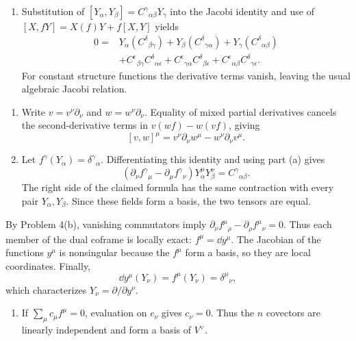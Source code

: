 \begin{enumerate}[leftmargin=2.8em,itemsep=1.2em]
\begin{enumerate}[label=\alph*),leftmargin=2em]
\item Substitution of
\([Y_\alpha,Y_\beta]=C^\gamma{}_{\alpha\beta}Y_\gamma\) into the Jacobi
identity and use of \([X,fY]=X(f)Y+f[X,Y]\) yields
\[
 \begin{split}
 0={}&Y_\alpha(C^\delta{}_{\beta\gamma})
     +Y_\beta(C^\delta{}_{\gamma\alpha})
     +Y_\gamma(C^\delta{}_{\alpha\beta})\\
 &+C^\epsilon{}_{\beta\gamma}C^\delta{}_{\alpha\epsilon}
  +C^\epsilon{}_{\gamma\alpha}C^\delta{}_{\beta\epsilon}
  +C^\epsilon{}_{\alpha\beta}C^\delta{}_{\gamma\epsilon}.
 \end{split}
\]
For constant structure functions the derivative terms vanish, leaving the
usual algebraic Jacobi relation.
\end{enumerate}

\begin{enumerate}[label=\alph*),leftmargin=2em]
\item Write \(v=v^\nu\partial_\nu\) and \(w=w^\nu\partial_\nu\).  Equality of
mixed partial derivatives cancels the second-derivative terms in
\(v(wf)-w(vf)\), giving
\[
 [v,w]^\mu=v^\nu\partial_\nu w^\mu-w^\nu\partial_\nu v^\mu.
\]

\item Let \(f^\gamma(Y_\alpha)=\delta^\gamma{}_{\alpha}\).  Differentiating
this identity and using part (a) gives
\[
 (\partial_\nu f^\gamma{}_\mu-
   \partial_\mu f^\gamma{}_\nu)
 Y_\alpha^\mu Y_\beta^\nu=C^\gamma{}_{\alpha\beta}.
\]
The right side of the claimed formula has the same contraction with every
pair \(Y_\alpha,Y_\beta\).  Since these fields form a basis, the two tensors
are equal.
\end{enumerate}

By Problem 4(b), vanishing commutators imply
\(\partial_\nu f^\mu{}_\rho-\partial_\rho f^\mu{}_\nu=0\).  Thus each member
of the dual coframe is locally exact: \(f^\mu=\dd y^\mu\).  The Jacobian of
the functions \(y^\mu\) is nonsingular because the \(f^\mu\) form a basis,
so they are local coordinates.  Finally,
\[
 \dd y^\mu(Y_\nu)=f^\mu(Y_\nu)=\delta^\mu{}_{\nu},
\]
which characterizes \(Y_\nu=\partial/\partial y^\nu\).

\begin{enumerate}[label=\alph*),leftmargin=2em]
\item If \(\sum_\mu c_\mu f^\mu=0\), evaluation on \(e_\nu\) gives
\(c_\nu=0\).  Thus the \(n\) covectors are linearly independent and form a
basis of \(V^\vee\).


\end{enumerate}
\end{enumerate}
